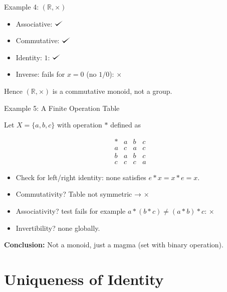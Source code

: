 \documentclass[11pt,aspectratio=43,ignorenonframetext,t]{beamer}
\newcounter{example_number} %
\def\checkmark{\tikz\fill[scale=0.4](0,.35) -- (.25,0) -- (1,.7) -- (.25,.15) -- cycle;}
\begin{document}
\begin{frame}{Example 4: $(\mathbb{R}, \times)$}
\begin{block}{}
    \begin{itemize}
  \item Associative: $\checkmark$
  \item Commutative: $\checkmark$
  \item Identity: \(1\): $\checkmark$
  \item Inverse: fails for \(x=0\) (no \(1/0\)): $\times$
\end{itemize}
Hence $(\mathbb{R}, \times)$ is a commutative monoid, not a group.
\end{block}
\end{frame}

\begin{frame}{Example 5: A Finite Operation Table}
\begin{block}{}
    Let \(X = \{a,b,c\}\) with operation $*$ defined as

\[
\begin{array}{c|ccc}
  * & a & b & c \\ \hline
  a & c & a & c \\
  b & a & b & c \\
  c & c & c & a
\end{array}
\]

\begin{itemize}
  \item Check for left/right identity: none satisfies \(e*x = x*e = x\).
  \item Commutativity? Table not symmetric → $\times$
  \item Associativity? test fails for example \(a*(b*c) \ne (a*b)*c\): $\times$
  \item Invertibility? none globally.
\end{itemize}
\textbf{Conclusion:} Not a monoid, just a magma (set with binary operation).
\end{block}
\end{frame}

\section{Uniqueness of Identity}
\end{document}
